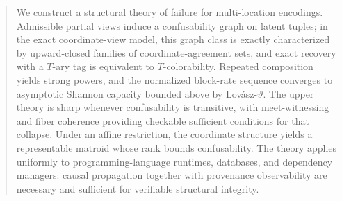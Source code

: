 \begin{abstract}
We construct a structural theory of failure for multi-location encodings. Admissible partial views induce a confusability graph on latent tuples; in the exact coordinate-view model, this graph class is exactly characterized by upward-closed families of coordinate-agreement sets, and exact recovery with a $T$-ary tag is equivalent to $T$-colorability. Repeated composition yields strong powers, and the normalized block-rate sequence converges to asymptotic Shannon capacity bounded above by Lov\'asz-$\vartheta$. The upper theory is sharp whenever confusability is transitive, with meet-witnessing and fiber coherence providing checkable sufficient conditions for that collapse. Under an affine restriction, the coordinate structure yields a representable matroid whose rank bounds confusability. The theory applies uniformly to programming-language runtimes, databases, and dependency managers: causal propagation together with provenance observability are necessary and sufficient for verifiable structural integrity.
\end{abstract}

